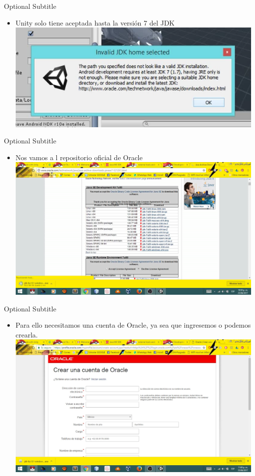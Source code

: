 \documentclass{beamer}
\begin{document}
\begin{frame}{21}{Optional Subtitle}
  \begin{itemize}
  \item {
    Unity solo tiene aceptada hasta la versión 7 del JDK
  }
  \includegraphics[width=\linewidth]{image/IU21}
  \end{itemize}
\end{frame}

\begin{frame}{22}{Optional Subtitle}
  \begin{itemize}
  \item {
    Nos vamos a l repositorio oficial de Oracle
  }
  \includegraphics[width=\linewidth]{image/IU22}
  \end{itemize}
\end{frame}

\begin{frame}{23}{Optional Subtitle}
  \begin{itemize}
  \item {
    Para ello necesitamos una cuenta de Oracle, ya sea que ingresemos o podemos crearla.
  }
  \includegraphics[width=\linewidth]{image/IU23}
  \end{itemize}
\end{frame}
\end{document}
